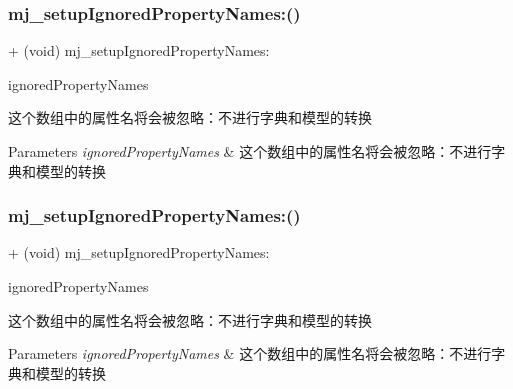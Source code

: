 \subsubsection{\texorpdfstring{mj\+\_\+setup\+Ignored\+Property\+Names\+:()}{mj\_setupIgnoredPropertyNames:()}\hspace{0.1cm}{\footnotesize\ttfamily [1/3]}}
{\footnotesize\ttfamily + (void) mj\+\_\+setup\+Ignored\+Property\+Names\+: \begin{DoxyParamCaption}\item[{(M\+J\+Ignored\+Property\+Names)}]{ignored\+Property\+Names }\end{DoxyParamCaption}}

这个数组中的属性名将会被忽略：不进行字典和模型的转换


\begin{DoxyParams}{Parameters}
{\em ignored\+Property\+Names} & 这个数组中的属性名将会被忽略：不进行字典和模型的转换 \\
\hline
\end{DoxyParams}
\mbox{\label{category_n_s_object_07_m_j_class_08_afd37a503c0b0d605038315aef0d3ef33}} 
\subsubsection{\texorpdfstring{mj\+\_\+setup\+Ignored\+Property\+Names\+:()}{mj\_setupIgnoredPropertyNames:()}\hspace{0.1cm}{\footnotesize\ttfamily [2/3]}}
{\footnotesize\ttfamily + (void) mj\+\_\+setup\+Ignored\+Property\+Names\+: \begin{DoxyParamCaption}\item[{(M\+J\+Ignored\+Property\+Names)}]{ignored\+Property\+Names }\end{DoxyParamCaption}}

这个数组中的属性名将会被忽略：不进行字典和模型的转换


\begin{DoxyParams}{Parameters}
{\em ignored\+Property\+Names} & 这个数组中的属性名将会被忽略：不进行字典和模型的转换 \\
\hline
\end{DoxyParams}
\mbox{\label{category_n_s_object_07_m_j_class_08_afd37a503c0b0d605038315aef0d3ef33}} 
